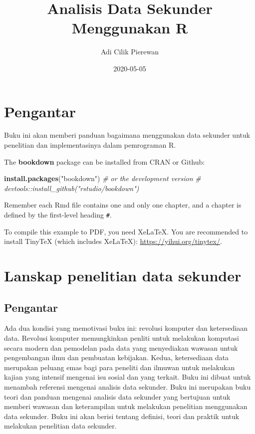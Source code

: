 \documentclass[
]{book}
\title{Analisis Data Sekunder Menggunakan R}
\author{Adi Cilik Pierewan}
\date{2020-05-05}
\newenvironment{Shaded}{\begin{snugshade}}{\end{snugshade}}
\newcommand{\CommentTok}[1]{\textcolor[rgb]{0.56,0.35,0.01}{\textit{#1}}}
\newcommand{\KeywordTok}[1]{\textcolor[rgb]{0.13,0.29,0.53}{\textbf{#1}}}
\newcommand{\NormalTok}[1]{#1}
\newcommand{\StringTok}[1]{\textcolor[rgb]{0.31,0.60,0.02}{#1}}
\begin{document}
\maketitle

{
\setcounter{tocdepth}{1}
\tableofcontents
}
\hypertarget{pengantar}{%
\chapter{Pengantar}\label{pengantar}}

Buku ini akan memberi panduan bagaimana menggunakan data sekunder untuk penelitian dan implementasinya dalam pemrograman R.

The \textbf{bookdown} package can be installed from CRAN or Github:

\begin{Shaded}
\begin{Highlighting}[]
\KeywordTok{install.packages}\NormalTok{(}\StringTok{"bookdown"}\NormalTok{)}
\CommentTok{\# or the development version}
\CommentTok{\# devtools::install\_github("rstudio/bookdown")}
\end{Highlighting}
\end{Shaded}

Remember each Rmd file contains one and only one chapter, and a chapter is defined by the first-level heading \texttt{\#}.

To compile this example to PDF, you need XeLaTeX. You are recommended to install TinyTeX (which includes XeLaTeX): \url{https://yihui.org/tinytex/}.

\hypertarget{lanskap-penelitian-data-sekunder}{%
\chapter{Lanskap penelitian data sekunder}\label{lanskap-penelitian-data-sekunder}}

\hypertarget{pengantar-1}{%
\section{Pengantar}\label{pengantar-1}}

Ada dua kondisi yang memotivasi buku ini: revolusi komputer dan ketersediaan data. Revolusi komputer memungkinkan penliti untuk melakukan komputasi secara modern dan pemodelan pada data yang menyediakan wawasan untuk pengembangan ilmu dan pembuatan kebijakan. Kedua, ketersediaan data merupakan peluang emas bagi para peneliti dan ilmuwan untuk melakukan kajian yang intensif mengenai isu sosial dan yang terkait. Buku ini dibuat untuk menambah referensi mengenai analisis data sekunder. Buku ini merupakan buku teori dan panduan mengenai analisis data sekunder yang bertujuan untuk memberi wawasan dan keterampilan untuk melakukan penelitian menggunakan data sekunder. Buku ini akan berisi tentang definisi, teori dan praktik untuk melakukan penelitian data sekunder.
\end{document}
